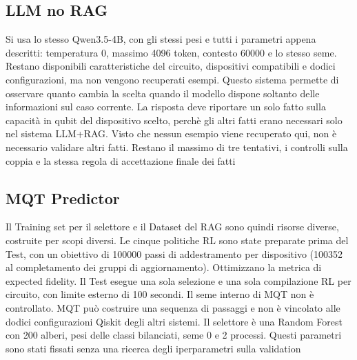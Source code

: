 \subsection{LLM no RAG}
Si usa lo stesso Qwen3.5-4B, con gli stessi pesi e tutti i parametri appena descritti: temperatura 0,
massimo 4096 token, contesto 60000 e lo stesso seme. Restano disponibili caratteristiche del circuito,
dispositivi compatibili e dodici configurazioni, ma non vengono recuperati esempi. Questo sistema
permette di osservare quanto cambia la scelta quando il modello dispone soltanto delle informazioni
sul caso corrente.
La risposta deve riportare un solo fatto sulla capacità in qubit del dispositivo scelto, perchè gli
altri fatti erano necessari solo nel sistema LLM+RAG. Visto che nessun esempio viene recuperato qui,
non è necessario validare altri fatti. Restano il massimo di tre tentativi, i controlli sulla coppia e la
stessa regola di accettazione finale dei fatti

\subsection{MQT Predictor}
Il Training set per il selettore e il Dataset del RAG sono quindi risorse diverse, costruite per scopi
diversi.
Le cinque politiche RL sono state preparate prima del Test, con un obiettivo di 100000 passi di
addestramento per dispositivo (100352 al completamento dei gruppi di aggiornamento). Ottimizzano
la metrica di expected fidelity. Il Test esegue una sola selezione e una sola compilazione RL per circuito,
con limite esterno di 100 secondi. Il seme interno di MQT non è controllato. MQT può costruire una
sequenza di passaggi e non è vincolato alle dodici configurazioni Qiskit degli altri sistemi.
Il selettore è una Random Forest con 200 alberi, pesi delle classi bilanciati, seme 0 e 2 processi.
Questi parametri sono stati fissati senza una ricerca degli iperparametri sulla validation 

